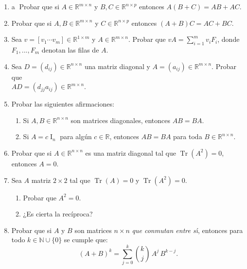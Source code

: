 \begin{enumerate}[resume, topsep=6pt, itemsep=.4cm]


\item\label{ej: distributiva} \textcircled{a} Probar que si $A\in\mathbb{R}^{m\times n}$ y $B,C\in\mathbb{R}^{n\times p}$ entonces
$A(B+ C)=AB + AC$.

\item Probar que si $A,B\in\mathbb{R}^{m\times n}$ y $C\in\mathbb{R}^{n\times p}$ entonces
$(A+B)C = AC + BC$.

\item Sea $v=[v_1 \cdots v_m]\in\mathbb{R}^{1\times m}$ y $A\in\mathbb{R}^{m\times n}$. Probar que $vA=\sum_{i=1}^m v_iF_i$, donde $F_1, ..., F_m$ denotan las filas de $A$.

\item Sea $D=(d_{ij})\in\mathbb{R}^{n\times n}$ una matriz diagonal y $A=(a_{ij})\in\mathbb{R}^{m\times n}$. Probar que \\ $AD=(d_{jj}a_{ij})\in\mathbb{R}^{m\times n}$.

\item
Probar las siguientes afirmaciones:
\begin{enumerate}[topsep=5pt,itemsep=5pt]
\item Si $A,B\in\mathbb{R}^{n\times n}$ son matrices diagonales, entonces $AB=BA$.
\item Si $A=c \operatorname{I}_n$ para algún $c \in \mathbb{R}$, entonces $AB=BA$ para toda $B\in\mathbb{R}^{n\times n}$.
\end{enumerate}

\item Probar que si $A\in\mathbb{R}^{n\times n}$ es una matriz diagonal tal que $\operatorname{Tr} (A^2)=0$, entonces $A=0$.

\item Sea $A$ matriz $2\times 2$  tal que $\operatorname{Tr}(A)=0$ y $\operatorname{Tr}(A^2)=0$.

\begin{enumerate}[topsep=5pt,itemsep=5pt]
    \item  Probar que $A^2 = 0$.
    \item  ¿Es cierta la recíproca?
\end{enumerate}


\item Probar que si $A$ y $B$ son matrices $n \times n$ \emph{que conmutan entre s\' \i}, entonces para todo $k \in \mathbb N \cup \{0\}$ se cumple que:
$$(A+B)^k = \sum_{j = 0}^k \binom{k}{j} \, A^j \, B^{k-j}.$$


\end{enumerate}
